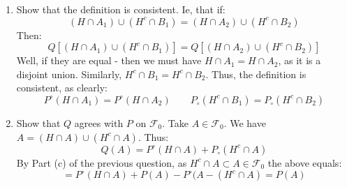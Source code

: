 \documentclass[12pt,a4paper]{article}
\newcommand{\1}[1]{\mathbbm{1}\left\{ #1 \right\}}
\newcommand{\fcal}{\mathcal{F}}
\begin{document}
\begin{enumerate}
	\item Show that the definition is consistent. Ie, that if:
	$$
		(H \cap A_1) \cup (H^c \cap B_1) = (H \cap A_2) \cup (H^c \cap B_2)
	$$
	Then:
	$$
		Q\left[(H \cap A_1) \cup (H^c \cap B_1)\right] = Q\left[(H \cap A_2) \cup (H^c \cap B_2)\right]
	$$
	Well, if they are equal - then we must have $H \cap A_1 = H \cap A_2$, as it is a disjoint union. Similarly, $H^c \cap B_1 = H^c \cap B_2$. Thus, the definition is consistent, as clearly:
	$$
		P^\circ(H \cap A_1) = P^\circ(H \cap A_2) \quad\quad
		P_\circ(H^c \cap B_1) = P_\circ(H^c \cap B_2)
	$$
	
	\item Show that $Q$ agrees with $P$ on $\fcal_0$. Take $A \in \fcal_0$. We have $A = (H \cap A) \cup (H^c \cap A)$. Thus:
	$$
		Q(A) = P^\circ(H \cap A) + P_\circ(H^c \cap A)
	$$
	By Part (c) of the previous question, as $H^c \cap A \subset A \in \fcal_0$ the above equals:
	$$
		= P^\circ(H \cap A) + P(A) - P^\circ(A - (H^c \cap A) = P(A)
	$$
	

\end{enumerate}
\end{document}
